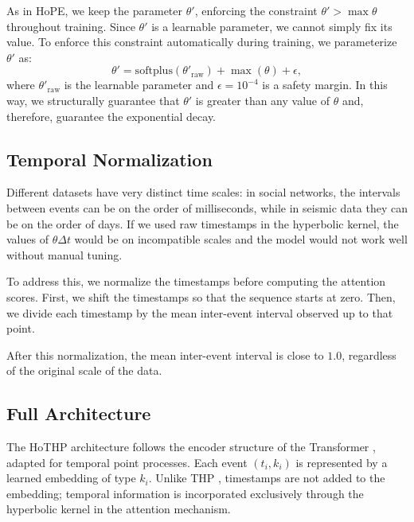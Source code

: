 \documentclass[runningheads]{llncs}
\begin{document}
As in HoPE, we keep the parameter $\theta'$, enforcing the constraint $\theta' > \max \theta$ throughout training. Since $\theta'$ is a learnable parameter, we cannot simply fix its value. To enforce this constraint automatically during training, we parameterize $\theta'$ as:
%
\begin{equation}
\theta' = \mathrm{softplus}(\theta'_{\mathrm{raw}}) + \max(\theta) + \epsilon,
\label{eq:theta_prime}
\end{equation}
%
where $\theta'_{\mathrm{raw}}$ is the learnable parameter and $\epsilon = 10^{-4}$ is a safety margin. In this way, we structurally guarantee that $\theta'$ is greater than any value of $\theta$ and, therefore, guarantee the exponential decay.

\subsection{Temporal Normalization}

Different datasets have very distinct time scales: in social networks, the intervals between events can be on the order of milliseconds, while in seismic data they can be on the order of days. If we used raw timestamps in the hyperbolic kernel, the values of $\theta \Delta t$ would be on incompatible scales and the model would not work well without manual tuning.

To address this, we normalize the timestamps before computing the attention scores. First, we shift the timestamps so that the sequence starts at zero. Then, we divide each timestamp by the mean inter-event interval observed up to that point.

After this normalization, the mean inter-event interval is close to $1{.}0$, regardless of the original scale of the data.

\subsection{Full Architecture}

The HoTHP architecture follows the encoder structure of the Transformer \cite{vaswani2017attention}, adapted for temporal point processes. Each event $(t_i, k_i)$ is represented by a learned embedding of type $k_i$. Unlike THP \cite{zuo2020transformer}, timestamps are not added to the embedding; temporal information is incorporated exclusively through the hyperbolic kernel in the attention mechanism.
\end{document}
